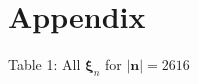 \documentclass[11pt, letterpaper]{article}
\begin{document}


\newpage
\appendix
\section{Appendix}\label{appendix}
\begin{center}
	Table 1: All $\boldsymbol{\xi}_n$ for $\left| \mathbf{n} \right| =2616$\label{tab:1}
\end{center}

\end{document}
